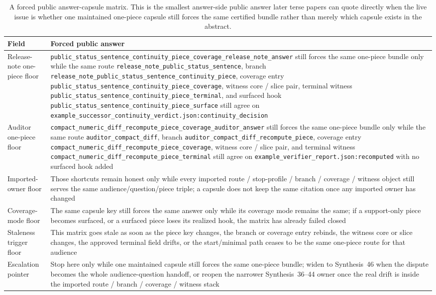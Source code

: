 \documentclass[11pt]{article}
\begin{document}
\begin{table}[t]
\centering
\small
\begin{tabularx}{\linewidth}{@{}Y Y@{}}
\toprule
Field & Forced public answer \\
\midrule
Release-note one-piece floor & \nolinkurl{public_status_sentence_continuity_piece_coverage_release_note_answer} still forces the same one-piece bundle only while the same route \nolinkurl{release_note_public_status_sentence}, branch \nolinkurl{release_note_public_status_sentence_continuity_piece}, coverage entry \nolinkurl{public_status_sentence_continuity_piece_coverage}, witness core / slice pair, terminal witness \nolinkurl{public_status_sentence_continuity_piece_terminal}, and surfaced hook \nolinkurl{public_status_sentence_continuity_piece_surface} still agree on \nolinkurl{example_successor_continuity_verdict.json:continuity_decision} \\
Auditor one-piece floor & \nolinkurl{compact_numeric_diff_recompute_piece_coverage_auditor_answer} still forces the same one-piece bundle only while the same route \nolinkurl{auditor_compact_diff}, branch \nolinkurl{auditor_compact_diff_recompute_piece}, coverage entry \nolinkurl{compact_numeric_diff_recompute_piece_coverage}, witness core / slice pair, and terminal witness \nolinkurl{compact_numeric_diff_recompute_piece_terminal} still agree on \nolinkurl{example_verifier_report.json:recomputed} with no surfaced hook added \\
Imported-owner floor & Those shortcuts remain honest only while every imported route / stop-profile / branch / coverage / witness object still serves the same audience/question/piece triple; a capsule does not keep the same citation once any imported owner has changed \\
Coverage-mode floor & The same capsule key still forces the same answer only while its coverage mode remains the same; if a support-only piece becomes surfaced, or a surfaced piece loses its realized hook, the matrix has already failed closed \\
Staleness trigger floor & This matrix goes stale as soon as the piece key changes, the branch or coverage entry rebinds, the witness core or slice changes, the approved terminal field drifts, or the start/minimal path ceases to be the same one-piece route for that audience \\
Escalation pointer & Stop here only while one maintained capsule still forces the same one-piece bundle; widen to Synthesis~46 when the dispute becomes the whole audience-question handoff, or reopen the narrower Synthesis~36--44 owner once the real drift is inside the imported route / branch / coverage / witness stack \\
\bottomrule
\end{tabularx}
\caption{A forced public answer-capsule matrix. This is the smallest answer-side public answer later terse papers can quote directly when the live issue is whether one maintained one-piece capsule still forces the same certified bundle rather than merely which capsule exists in the abstract.}
\label{tab:forced-public-answer-capsule-matrix}
\end{table}
\end{document}
